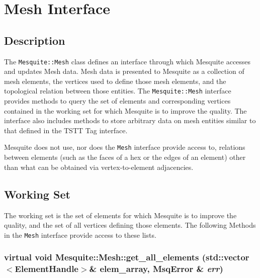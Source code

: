 \chapter{Mesh Interface}
\label{append_mesh}

\newcommand{\entrylabel}[1]{
   {\parbox[b]{\labelwidth-4pt}{\makebox[0pt][l]{\textbf{#1}}\\}}}
\newenvironment{Desc}
{\begin{list}{}
  {
    \settowidth{\labelwidth}{40pt}
    \setlength{\leftmargin}{\labelwidth}
    \setlength{\parsep}{0pt}
    \setlength{\itemsep}{-4pt}
    \renewcommand{\makelabel}{\entrylabel}
  }
}
{\end{list}}

\section{Description}
The \texttt{Mesquite::Mesh} class defines an interface through which Mesquite accesses and updates Mesh data.
Mesh data is presented to Mesquite as a collection of mesh elements, the vertices used to define those mesh elements, and the
topological relation between those entities.  The \texttt{Mesquite::Mesh} interface provides methods to query
the set of elements and corresponding vertices contained in the working set for which Mesquite is to improve the quality.  The interface 
also includes methods to store arbitrary data on mesh entities similar to that defined in the TSTT Tag interface.

Mesquite does not use, nor does the \texttt{Mesh} interface provide access to,
relations between elements (such as the faces of a hex or the edges of an element) 
other than what can be obtained via vertex-to-element adjacencies.


\section{Working Set}

The working set is the set of elements for which Mesquite is to improve the quality, and the set of all vertices defining those elements.  
The following Methods in the \texttt{Mesh} interface provide access to these lists.

\subsection{\setlength{\rightskip}{0pt plus 5cm}virtual void Mesquite::Mesh::get\_\-all\_\-elements (std::vector$<$ElementHandle$>$\& elem\_\-array, {\bf Msq\-Error} \& {\em err})\hspace{0.3cm}{\tt  [pure virtual]}}\label{classMesquite_1_1Mesh_a4}

